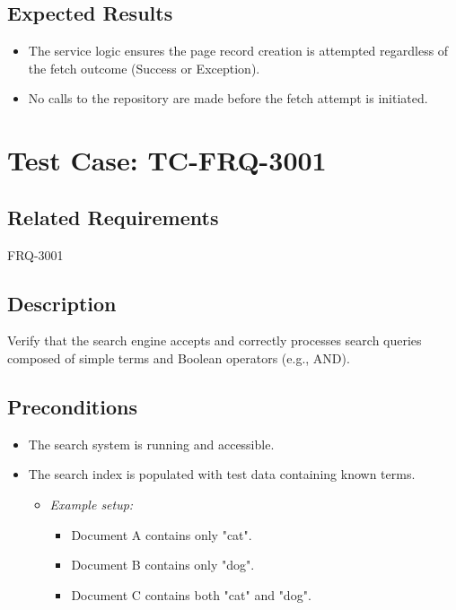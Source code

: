 \documentclass{article}
\begin{document}
\subsection*{Expected Results}
\begin{itemize}
    \item The service logic ensures the page record creation is attempted regardless of the fetch outcome (Success or Exception).
    \item No calls to the repository are made before the fetch attempt is initiated.
\end{itemize}

\section{Test Case: TC-FRQ-3001}

\subsection*{Related Requirements}
FRQ-3001

\subsection*{Description}
Verify that the search engine accepts and correctly processes search queries composed of simple terms and Boolean operators (e.g., AND).

\subsection*{Preconditions}
\begin{itemize}
  \item The search system is running and accessible.
  \item The search index is populated with test data containing known terms.
  \begin{itemize}
    \item[] \textit{Example setup:}
    \begin{itemize}
        \item Document A contains only "cat".
        \item Document B contains only "dog".
        \item Document C contains both "cat" and "dog".
    \end{itemize}
  \end{itemize}
\end{itemize}
\end{document}
